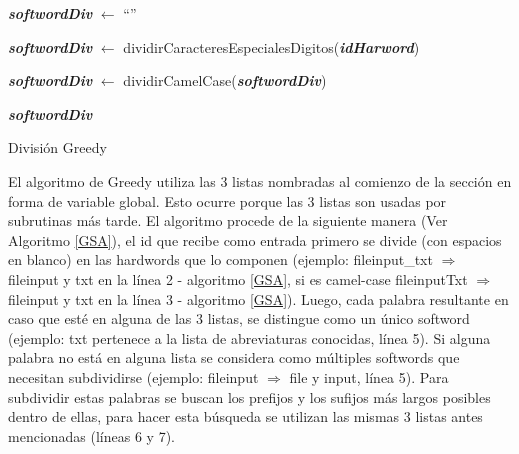 \begin{algorithm}[b!]%
\LinesNumbered%

\BlankLine
\textit{\textbf{softwordDiv}} $\leftarrow$ “”

\textit{\textbf{softwordDiv}} $\leftarrow$ dividirCaracteresEspecialesDigitos(\textit{\textbf{idHarword}})

\textit{\textbf{softwordDiv}} $\leftarrow$ dividirCamelCase(\textit{\textbf{softwordDiv}})

\BlankLine
{}
\BlankLine
\Return \textit{\textbf{softwordDiv}} 

\caption{División Greedy\label{GSA}}
\end{algorithm}



El algoritmo de Greedy utiliza las 3 listas nombradas al comienzo de la sección en forma de variable global. Esto ocurre porque las 3 listas son usadas por subrutinas más tarde. El algoritmo procede de la siguiente manera (Ver Algoritmo \ref{GSA}), el id que recibe como entrada primero se divide (con espacios en blanco) en las hardwords que lo componen (ejemplo: \textsf{fileinput\_txt} $\Rightarrow$ \mbox{\textsf{fileinput}} y \textsf{txt} en la línea 2 - algoritmo \ref{GSA}, si es camel-case \textsf{fileinputTxt} $\Rightarrow$ \textsf{fileinput} y \textsf{txt} en la línea 3 - algoritmo \ref{GSA}). Luego, cada palabra resultante en caso que esté en alguna de las 3 listas, se distingue como un único softword (ejemplo: \textsf{txt} pertenece a la lista de abreviaturas conocidas, línea 5). Si alguna palabra no está en alguna lista se considera como múltiples softwords que necesitan subdividirse (ejemplo: \textsf{fileinput} $\Rightarrow$ \textsf{file} y \textsf{input}, línea 5).
Para subdividir estas palabras se buscan los prefijos y los sufijos más largos posibles dentro de ellas, para hacer esta búsqueda se utilizan las mismas 3 listas antes mencionadas (líneas 6 y 7).


